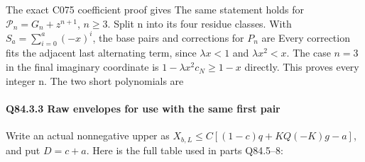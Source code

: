 The exact C075 coefficient proof gives
The same statement holds for \(\mathcal P_n=G_n+z^{n+1}\), \(n\ge 3\).
Split n into its four residue classes. With
\(S_a=\sum_{i=0}^a(-x)^i\), the base pairs and corrections for \(P_n\) are
Every correction fits the adjacent last alternating term, since
\(\lambda x<1\) and \(\lambda x^2<x\). The case \(n=3\) in the final
imaginary coordinate is \(1-\lambda x^2c_N\ge1-x\) directly.
This proves every integer n. The two short polynomials are

\paragraph{Q84.3.3 Raw envelopes for use with the same first pair}\label{part:Q84.3.3}

Write an actual nonnegative upper as
\(X_{b,\allowbreak  L}\le C[(1-c)q+KQ(-K)g-a]\), and put \(D=c+a\).
Here is the full table used in parts Q84.5--8:



